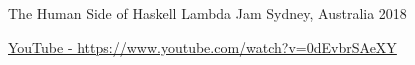 


\begin{cventries}


\cventry
{The Human Side of Haskell} %
{Lambda Jam} %
{Sydney, Australia} %
{2018} %
{ %
\begin{cvitems}
\item { \color{awesome-nephritis} \href{https://www.youtube.com/watch?v=0dEvbrSAeXY}{\faExternalLinkSquare \acvHeaderIconSep YouTube - https://www.youtube.com/watch?v=0dEvbrSAeXY} }
\end{cvitems}
}
{}


\end{cventries}